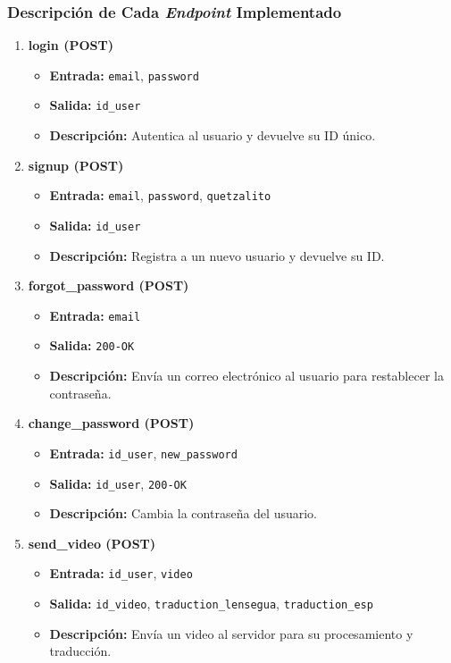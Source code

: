 \subsubsection{Descripción de Cada \textit{Endpoint} Implementado}

\begin{enumerate}
    \item \textbf{login (POST)}
    \begin{itemize}
        \item \textbf{Entrada:} \texttt{email}, \texttt{password}
        \item \textbf{Salida:} \texttt{id\_user}
        \item \textbf{Descripción:} Autentica al usuario y devuelve su ID único.
    \end{itemize}

    \item \textbf{signup (POST)}
    \begin{itemize}
        \item \textbf{Entrada:} \texttt{email}, \texttt{password}, \texttt{quetzalito}
        \item \textbf{Salida:} \texttt{id\_user}
        \item \textbf{Descripción:} Registra a un nuevo usuario y devuelve su ID.
    \end{itemize}

    \item \textbf{forgot\_password (POST)}
    \begin{itemize}
        \item \textbf{Entrada:} \texttt{email}
        \item \textbf{Salida:} \texttt{200-OK}
        \item \textbf{Descripción:} Envía un correo electrónico al usuario para restablecer la contraseña.
    \end{itemize}

    \item \textbf{change\_password (POST)}
    \begin{itemize}
        \item \textbf{Entrada:} \texttt{id\_user}, \texttt{new\_password}
        \item \textbf{Salida:} \texttt{id\_user}, \texttt{200-OK}
        \item \textbf{Descripción:} Cambia la contraseña del usuario.
    \end{itemize}

    \item \textbf{send\_video (POST)}
    \begin{itemize}
        \item \textbf{Entrada:} \texttt{id\_user}, \texttt{video}
        \item \textbf{Salida:} \texttt{id\_video}, \texttt{traduction\_lensegua}, \texttt{traduction\_esp}
        \item \textbf{Descripción:} Envía un video al servidor para su procesamiento y traducción.
    \end{itemize}


\end{enumerate}
